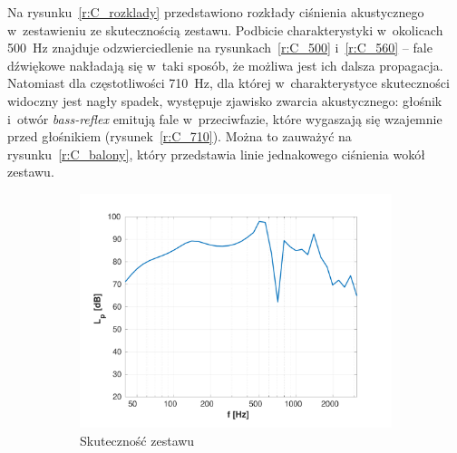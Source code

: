 \documentclass[12pt]{oska}
\begin{document}
		Na rysunku~\ref{r:C_rozklady} przedstawiono rozkłady ciśnienia akustycznego w~zestawieniu ze skutecznością zestawu. Podbicie charakterystyki w~okolicach \SI{500}{\hertz} znajduje odzwierciedlenie na rysunkach~\ref{r:C_500} i~\ref{r:C_560} -- fale dźwiękowe nakładają się w~taki sposób, że możliwa jest ich dalsza propagacja. Natomiast dla częstotliwości \SI{710}{\hertz}, dla której w~charakterystyce skuteczności widoczny jest nagły spadek, występuje zjawisko zwarcia akustycznego: głośnik i~otwór \textit{bass-reflex} emitują fale w~przeciwfazie, które wygaszają się wzajemnie przed głośnikiem (rysunek~\ref{r:C_710}). Można to zauważyć na rysunku~\ref{r:C_balony}, który przedstawia linie jednakowego ciśnienia wokół zestawu.
		
		\begin{figure}[!ht]
		\centering
			\begin{subfigure}[b]{.49\textwidth}
			\includegraphics[width=\textwidth,trim={1.25cm .5cm 2cm 1cm},clip]{skutecznosc_comsol.pdf}
				\caption{Skuteczność zestawu}
				\label{r:C_skutecznosc}
			\end{subfigure}
			~
			\begin{subfigure}[b]{.49\textwidth}

\end{subfigure}
\end{figure}
\end{document}
